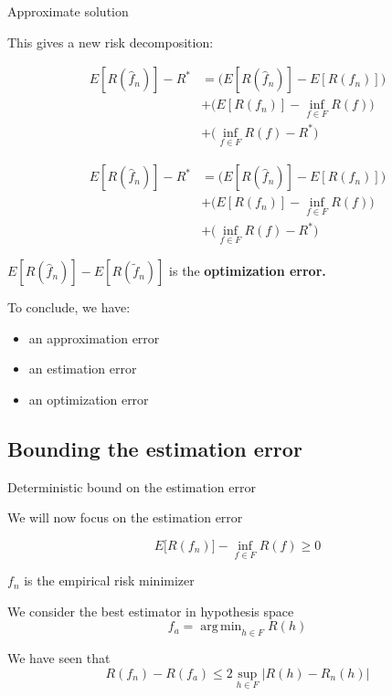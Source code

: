 \documentclass[usenames,dvipsnames]{beamer}
\DeclareMathOperator*{\argmin}{arg\,min}
\begin{document}
\begin{frame}{Approximate solution}

    This gives a new risk decomposition:

\begin{equation}
    \begin{aligned}
        \label{eq:}
        E[R( \hat{f}_n)]-R^* &= \Big( E[R( \hat{f}_n)]-E[R(f_n)]\Big)\\
        &+ \Big(E[R(f_n)]- \inf_{f\in F}R(f)\Big)\\
        &+\Big(\inf_{f\in F}R(f)-R^* \Big)
    \end{aligned}
\end{equation}
    
\end{frame}

\begin{frame}

\begin{equation}
    \begin{aligned}
        \label{eq:}
        E[R( \hat{f}_n)]-R^* &= \Big( E[R( \hat{f}_n)]-E[R(f_n)]\Big)\\
        &+ \Big(E[R( f_n)]- \inf_{f\in F}R(f)\Big)\\
        &+\Big(\inf_{f\in F}R(f)-R^* \Big)
    \end{aligned}
\end{equation}

$E[R( \hat{f}_n)]-E[R(\tilde{f}_n)] $ is the \textbf{{optimization error.}} 

To conclude, we have:
\begin{itemize}
    \item an approximation error
    \item an estimation error
    \item an optimization error
\end{itemize}
    
\end{frame}

\subsection{Bounding the estimation error}

\begin{frame}{Deterministic bound on the estimation error}

    We will now focus on the estimation error

	\begin{equation*}
	    E\Big[R( f_n)\Big]- \inf_{f\in F}R(f)\geq 0
	\end{equation*}

	    $f_n$ is the empirical risk minimizer

We consider the best estimator in hypothesis space
    \begin{equation*}
	f_a = \argmin_{h\in F}R(h)
    \end{equation*}

    We have seen that
    \begin{equation}
	R( f_n)-R(f_a) \leq 2 \sup_{h\in F}|R(h)-R_n(h)|
    \end{equation}

\end{frame}
\end{document}
